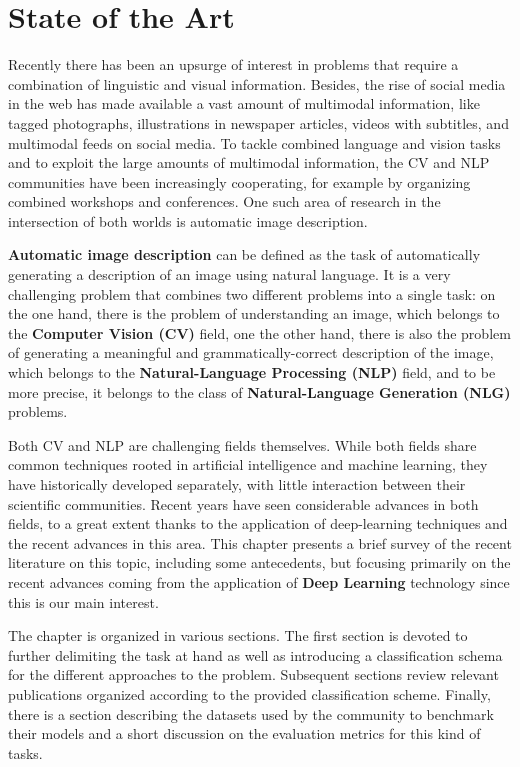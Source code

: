 \chapter{State of the Art}
\label{ch:state_of_the_art}

Recently there has been an upsurge of interest in problems that require a combination of linguistic and visual information. Besides, the rise of social media in the web has made available a vast amount of multimodal information, like tagged photographs, illustrations in newspaper articles, videos with subtitles, and multimodal feeds on social media. To tackle combined language and vision tasks and to exploit the large amounts of multimodal information, the CV and NLP communities have been increasingly cooperating, for example by organizing combined workshops and conferences. One such area of research in the intersection of both worlds is automatic image description.

\textbf{Automatic image description} can be defined as the task of automatically generating a description of an image using natural language. It is a very challenging problem that combines two different problems into a single task: on the one hand, there is the problem of understanding an image, which belongs to the \textbf{Computer Vision (CV)} field, one the other hand, there is also the problem of generating a meaningful and grammatically-correct description of the image, which belongs to the \textbf{Natural-Language Processing (NLP)} field, and to be more precise, it belongs to the class of \textbf{Natural-Language Generation (NLG)} problems.

Both CV and NLP are challenging fields themselves. While both fields share common techniques rooted in artificial intelligence and machine learning, they have historically developed separately, with little interaction between their scientific communities.  Recent years have seen considerable advances in both fields, to a great extent thanks to the application of deep-learning techniques and the recent advances in this area. This chapter presents a brief survey of the recent literature on this topic, including some antecedents, but focusing primarily on the recent advances coming from the application of \textbf{Deep Learning} technology since this is our main interest.

The chapter is organized in various sections. The first section is devoted to further delimiting the task at hand as well as introducing a classification schema for the different approaches to the problem. Subsequent sections review relevant publications organized according to the provided classification scheme. Finally, there is a section describing the datasets used by the community to benchmark their models and a short discussion on the evaluation metrics for this kind of tasks.

